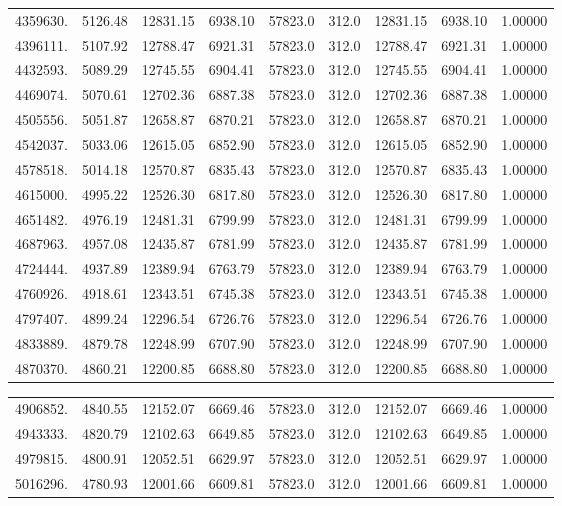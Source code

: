 {\begin{tabular}{rrrrrrrrr}
4359630. & 5126.48& 12831.15 & 6938.10 & 57823.0   & 312.0& 12831.15 & 6938.10 & 1.00000 \\
4396111. & 5107.92& 12788.47 & 6921.31 & 57823.0   & 312.0& 12788.47 & 6921.31 & 1.00000 \\
4432593. & 5089.29& 12745.55 & 6904.41 & 57823.0   & 312.0& 12745.55 & 6904.41 & 1.00000 \\
4469074. & 5070.61& 12702.36 & 6887.38 & 57823.0   & 312.0& 12702.36 & 6887.38 & 1.00000 \\
4505556. & 5051.87& 12658.87 & 6870.21 & 57823.0   & 312.0& 12658.87 & 6870.21 & 1.00000 \\
4542037. & 5033.06& 12615.05 & 6852.90 & 57823.0   & 312.0& 12615.05 & 6852.90 & 1.00000 \\
4578518. & 5014.18& 12570.87 & 6835.43 & 57823.0   & 312.0& 12570.87 & 6835.43 & 1.00000 \\
4615000. & 4995.22& 12526.30 & 6817.80 & 57823.0   & 312.0& 12526.30 & 6817.80 & 1.00000 \\
4651482. & 4976.19& 12481.31 & 6799.99 & 57823.0   & 312.0& 12481.31 & 6799.99 & 1.00000 \\
4687963. & 4957.08& 12435.87 & 6781.99 & 57823.0   & 312.0& 12435.87 & 6781.99 & 1.00000 \\
4724444. & 4937.89& 12389.94 & 6763.79 & 57823.0   & 312.0& 12389.94 & 6763.79 & 1.00000 \\
4760926. & 4918.61& 12343.51 & 6745.38 & 57823.0   & 312.0& 12343.51 & 6745.38 & 1.00000 \\
4797407. & 4899.24& 12296.54 & 6726.76 & 57823.0   & 312.0& 12296.54 & 6726.76 & 1.00000 \\
4833889. & 4879.78& 12248.99 & 6707.90 & 57823.0   & 312.0& 12248.99 & 6707.90 & 1.00000 \\
4870370. & 4860.21& 12200.85 & 6688.80 & 57823.0   & 312.0& 12200.85 & 6688.80 & 1.00000 \\
\end{tabular}
\newpage
\begin{tabular}{rrrrrrrrr} \\
4906852. & 4840.55& 12152.07 & 6669.46 & 57823.0   & 312.0& 12152.07 & 6669.46 & 1.00000 \\
4943333. & 4820.79& 12102.63 & 6649.85 & 57823.0   & 312.0& 12102.63 & 6649.85 & 1.00000 \\
4979815. & 4800.91& 12052.51 & 6629.97 & 57823.0   & 312.0& 12052.51 & 6629.97 & 1.00000 \\
5016296. & 4780.93& 12001.66 & 6609.81 & 57823.0   & 312.0& 12001.66 & 6609.81 & 1.00000 \\

\end{tabular}}
